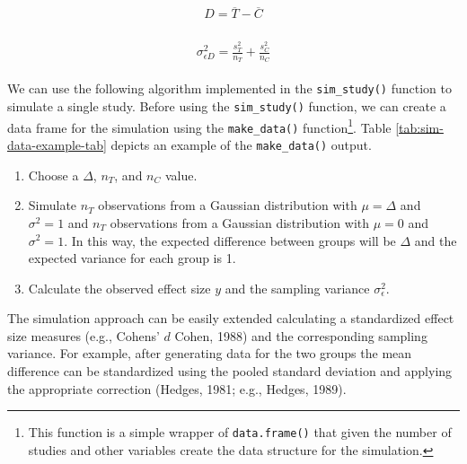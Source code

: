 \documentclass[
  man,floatsintext]{apa6}
\providecommand{\tightlist}{%
  \setlength{\itemsep}{0pt}\setlength{\parskip}{0pt}}
\begin{document}
\begin{align}
\begin{gathered}
D = \overline{T} - \overline{C}
\label{eq:effsize}
\end{gathered}
\end{align}

\begin{align}
\begin{gathered}
\sigma_{\epsilon D}^{2} = \frac{s^2_T}{n_T} + \frac{s^2_C}{n_C}
\label{eq:effsizevar}
\end{gathered}
\end{align}

We can use the following algorithm implemented in the \texttt{sim\_study()} function to simulate a single study. Before using the \texttt{sim\_study()}
function, we can create a data frame for the simulation using the \texttt{make\_data()} function\footnote{This function is a simple wrapper of \texttt{data.frame()} that given the number of studies and other variables create the data structure for the simulation.}. Table \ref{tab:sim-data-example-tab} depicts an example of the \texttt{make\_data()} output.

\begin{enumerate}
\def\labelenumi{\arabic{enumi}.}
\tightlist
\item
  Choose a \(\Delta\), \(n_{T}\), and \(n_{C}\) value.
\item
  Simulate \(n_{T}\) observations from a Gaussian distribution with \(\mu = \Delta\) and \(\sigma^{2} = 1\) and \(n_{T}\) observations from a Gaussian distribution with \(\mu = 0\) and \(\sigma^{2} = 1\). In this way, the expected difference between groups will be \(\Delta\) and the expected variance for each group is 1.
\item
  Calculate the observed effect size \(y\) and the sampling variance \(\sigma_{\epsilon}^{2}\).
\end{enumerate}

The simulation approach can be easily extended calculating a standardized effect size measures (e.g., Cohens' \(d\) Cohen, 1988) and the corresponding sampling variance. For example, after generating data for the two groups the mean difference can be standardized using the pooled standard deviation and applying the appropriate correction (Hedges, 1981; e.g., Hedges, 1989).

\scriptsize
\end{document}
